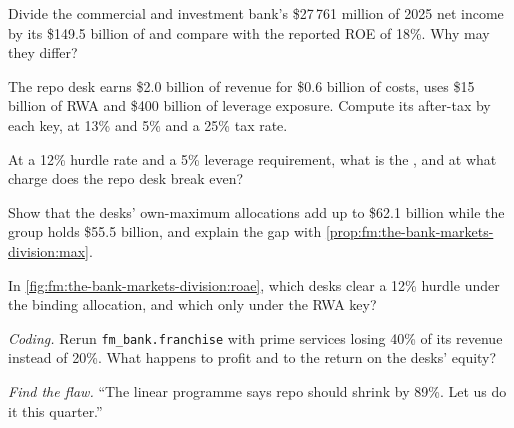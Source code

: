 \begin{exercise}[$\star$]\label{exo:fm:the-bank-markets-division:2}
Divide the commercial and investment bank's \$27\,761 million of 2025 net income by its \$149.5 billion of  and compare with the
reported ROE of 18\%. Why may they differ?
\end{exercise}

\begin{exercise}[$\star$]\label{exo:fm:the-bank-markets-division:3}
The repo desk earns \$2.0 billion of revenue for \$0.6 billion of costs, uses \$15 billion of RWA and \$400 billion of leverage exposure. Compute its
after-tax  by each key, at 13\% and 5\% and a 25\% tax rate.
\end{exercise}

\begin{exercise}[$\star\star$]\label{exo:fm:the-bank-markets-division:4}
At a 12\% hurdle rate and a 5\% leverage requirement, what is the , and at what charge does the repo desk break even?
\end{exercise}

\begin{exercise}[$\star\star$]\label{exo:fm:the-bank-markets-division:5}
Show that the desks' own-maximum allocations add up to \$62.1 billion while the group holds \$55.5 billion, and explain the gap with
\cref{prop:fm:the-bank-markets-division:max}.
\end{exercise}

\begin{exercise}[$\star\star$]\label{exo:fm:the-bank-markets-division:6}
In \cref{fig:fm:the-bank-markets-division:roae}, which desks clear a 12\% hurdle under the binding allocation, and which only under the RWA key?
\end{exercise}

\begin{exercise}[$\star\star\star$]\label{exo:fm:the-bank-markets-division:7}
\emph{Coding.} Rerun \texttt{fm\_bank.franchise} with prime services losing 40\% of its revenue instead of 20\%. What happens to profit and to the
return on the desks' equity?
\end{exercise}

\begin{exercise}[$\star\star\star$]\label{exo:fm:the-bank-markets-division:8}
\emph{Find the flaw.} ``The linear programme says repo should shrink by 89\%. Let us do it this quarter.''
\end{exercise}

